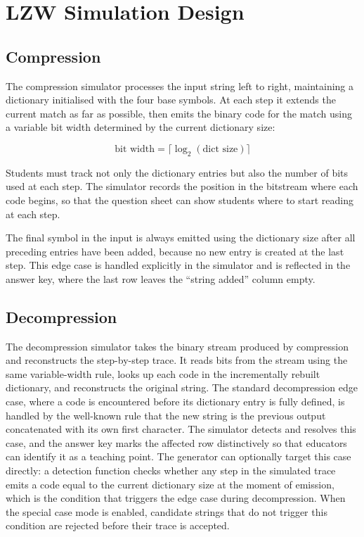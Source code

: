 \documentclass{l4proj}
\begin{document}
\section{LZW Simulation Design}

\subsection{Compression}

The compression simulator processes the input string left to right, maintaining a dictionary initialised with the four base symbols. At each step it extends the current match as far as possible, then emits the binary code for the match using a variable bit width determined by the current dictionary size:

\begin{equation}
    \text{bit width} = \lceil \log_2(\text{dict size}) \rceil
\end{equation}

Students must track not only the dictionary entries but also the number of bits used at each step. The simulator records the position in the bitstream where each code begins, so that the question sheet can show students where to start reading at each step.

The final symbol in the input is always emitted using the dictionary size after all preceding entries have been added, because no new entry is created at the last step. This edge case is handled explicitly in the simulator and is reflected in the answer key, where the last row leaves the “string added” column empty.

\subsection{Decompression}

The decompression simulator takes the binary stream produced by compression and reconstructs the step-by-step trace. It reads bits from the stream using the same variable-width rule, looks up each code in the incrementally rebuilt dictionary, and reconstructs the original string. The standard decompression edge case, where a code is encountered before its dictionary entry is fully defined, is handled by the well-known rule that the new string is the previous output concatenated with its own first character. The simulator detects and resolves this case, and the answer key marks the affected row distinctively so that educators can identify it as a teaching point. The generator can optionally target this case directly: a detection function checks whether any step in the simulated trace emits a code equal to the current dictionary size at the moment of emission, which is the condition that triggers the edge case during decompression. When the special case mode is enabled, candidate strings that do not trigger this condition are rejected before their trace is accepted.
\end{document}
